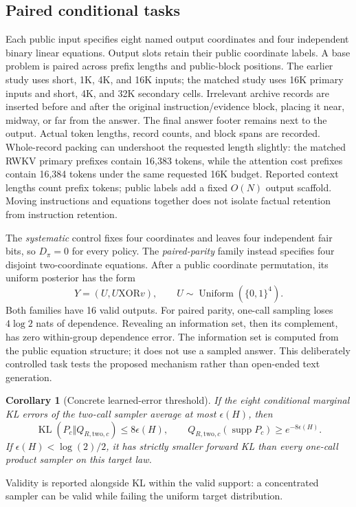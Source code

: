 \documentclass{article}
\newtheorem{corollary}{Corollary}
\newcommand{\KL}{\operatorname{KL}}
\begin{document}
\subsection{Paired conditional tasks}
Each public input specifies eight named output coordinates and four independent
binary linear equations. Output slots retain their public coordinate labels.
A base problem is paired across prefix lengths and public-block positions.
The earlier study uses short, 1K, 4K, and 16K inputs; the matched study uses
16K primary inputs and short, 4K, and 32K secondary cells. Irrelevant archive records are
inserted before and after the original instruction/evidence block, placing it
near, midway, or far from the answer. The final answer footer remains next to
the output. Actual token lengths, record counts, and block spans are recorded.
Whole-record packing can undershoot the requested length slightly: the
matched RWKV primary prefixes contain 16,383 tokens, while the attention
cost prefixes contain 16,384 tokens under the same requested 16K budget.
Reported context lengths count prefix tokens; public labels add a fixed
$O(N)$ output scaffold. Moving instructions and equations together does not
isolate factual retention from instruction retention.

The \emph{systematic} control fixes four coordinates and leaves four independent
fair bits, so $D_\pi=0$ for every policy. The \emph{paired-parity} family instead
specifies four disjoint two-coordinate equations. After a public coordinate
permutation, its uniform posterior has the form
\begin{equation}
 Y=(U,U\mathbin{\mathrm{XOR}}v),\qquad
 U\sim\operatorname{Uniform}(\{0,1\}^4).
\end{equation}
Both families have 16 valid outputs. For paired parity, one-call sampling
loses $4\log2$ nats of dependence. Revealing an information set, then its
complement, has zero within-group dependence error. The information set is
computed from the public equation structure; it does not use a sampled answer.
This deliberately controlled task tests the proposed mechanism rather than
open-ended text generation.

\begin{corollary}[Concrete learned-error threshold]
If the eight conditional marginal KL errors of the two-call sampler average
at most $\epsilon(H)$, then
\begin{equation}
 \KL(P_c\Vert Q_{R,\mathrm{two},c})\le8\epsilon(H),\qquad
 Q_{R,\mathrm{two},c}(\operatorname{supp}P_c)\ge e^{-8\epsilon(H)}.
\end{equation}
If $\epsilon(H)<\log(2)/2$, it has strictly smaller forward KL than every
one-call product sampler on this target law.
\end{corollary}
Validity is reported alongside KL within the valid support: a concentrated
sampler can be valid while failing the uniform target distribution.
\end{document}
